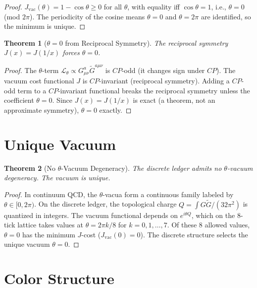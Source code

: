 \documentclass[12pt,a4paper]{article}
\newtheorem{theorem}{Theorem}[section]
\theoremstyle{definition}
\theoremstyle{remark}
\begin{document}
\begin{proof}
$J_{\mathrm{vac}}(\theta) = 1 - \cos\theta \geq 0$ for all
$\theta$, with equality iff $\cos\theta = 1$, i.e., $\theta = 0$
(mod $2\pi$).  The periodicity of the cosine means $\theta = 0$
and $\theta = 2\pi$ are identified, so the minimum is unique.
\end{proof}

\begin{theorem}[$\theta = 0$ from Reciprocal Symmetry]
\label{thm:reciprocal}
The reciprocal symmetry $J(x) = J(1/x)$ forces $\theta = 0$.
\end{theorem}

\begin{proof}
The $\theta$-term $\mathcal{L}_\theta \propto
G_{\mu\nu}^a\tilde{G}^{a\mu\nu}$ is $CP$-odd (it changes sign
under $CP$).  The vacuum cost functional $J$ is $CP$-invariant
(reciprocal symmetry).  Adding a $CP$-odd term to a $CP$-invariant
functional breaks the reciprocal symmetry unless the coefficient
$\theta = 0$.  Since $J(x) = J(1/x)$ is exact (a theorem, not an
approximate symmetry), $\theta = 0$ exactly.
\end{proof}

\section{Unique Vacuum}
\label{sec:unique}

\begin{theorem}[No $\theta$-Vacuum Degeneracy]
The discrete ledger admits no $\theta$-vacuum degeneracy.  The
vacuum is unique.
\end{theorem}

\begin{proof}
In continuum QCD, the $\theta$-vacua form a continuous family
labeled by $\theta \in [0, 2\pi)$.  On the discrete ledger, the
topological charge $Q = \int G\tilde{G}/(32\pi^2)$ is quantized
in integers.  The vacuum functional depends on $e^{i\theta Q}$,
which on the 8-tick lattice takes values at
$\theta = 2\pi k/8$ for $k = 0, 1, \ldots, 7$.  Of these 8
allowed values, $\theta = 0$ has the minimum $J$-cost
($J_{\mathrm{vac}}(0) = 0$).  The discrete structure selects the
unique vacuum $\theta = 0$.
\end{proof}

\section{Color Structure}
\label{sec:color}
\end{document}
